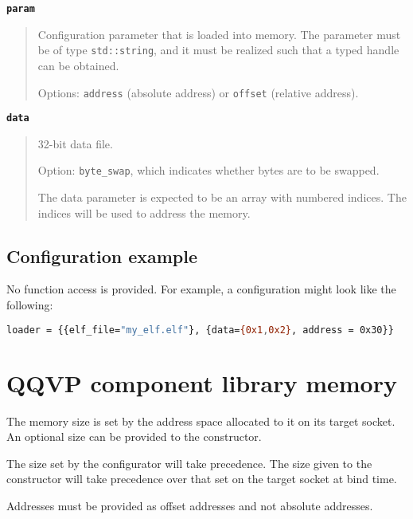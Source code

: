 {\textbf {\footnotesize{\lstinline!param!}}}
\vspace{-2pt}
\begin{quote}
Configuration parameter that is loaded into memory. The parameter must be of type {\small{\lstinline!std::string!}}, and it must be realized such that a typed handle can be obtained.

Options: {\small{\lstinline!address!}} (absolute address) or {\small{\lstinline!offset!}} (relative address).
\end{quote}


{\textbf {\footnotesize{\lstinline!data!}}}
\vspace{-2pt}
\begin{quote}
32-bit data file.

Option: {\small{\lstinline!byte_swap!}}, which indicates whether bytes are to be swapped.

The data parameter is expected to be an array with numbered indices. The indices will be used to address the memory.
\end{quote}


\subsection{Configuration example}

No function access is provided. For example, a configuration might look like the following:

\small
\begin{lstlisting}[language=bash]
    loader = {{elf_file="my_elf.elf"}, {data={0x1,0x2}, address = 0x30}}
\end{lstlisting}
\normalsize


\clearpage
\section{QQVP component library memory}

The memory size is set by the address space allocated to it on its target socket. An optional size can be provided to the constructor.

The size set by the configurator will take precedence. The size given to the constructor will take precedence over that set on the target socket at bind time.

\note Addresses must be provided as offset addresses and not absolute addresses.

